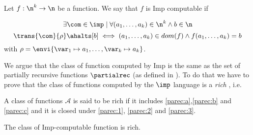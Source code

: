 
\begin{definition}
  Let \(f : \n^k \to \n\) be a function. We say that \(f\) is Imp
  computable if

  \[\exists \com \in\imp \mid \forall (a_1, \dots, a_k) \in \n^k \wedge
  b \in \n \] \[\trans{\com}{\rho} \ahalts[b] \iff (a_1, \dots, a_k)
  \in dom(f) \wedge f(a_1,\dots,a_k) = b\] with \(\rho = \envi{\var_1
    \mapsto a_1, \dots, \var_k \mapsto a_k}\).
\end{definition}

We argue that the class of function computed by Imp is the same as the
set of partially recursive functions \(\partialrec\) (as defined in
\cite{cutland1980computability}). To do that we have to prove that the
class of functions computed by the \(\imp\) language is a \emph{rich}
, i.e.

\begin{definition}
  A class of functions \(\mathcal{A}\) is said to be rich if it
  includes \ref{parec:a},\ref{parec:b} and \ref{parec:c} and it is
  closed under \ref{parec:1}, \ref{parec:2} and \ref{parec:3}.
\end{definition}

\begin{lemma}
  The class of Imp-computable function is rich.
\end{lemma}

